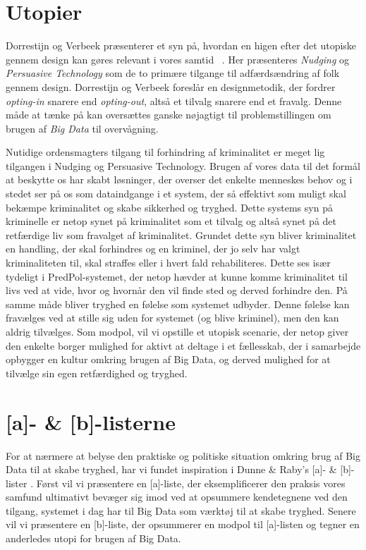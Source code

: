 \section*{Utopier}
Dorrestijn og Verbeek præsenterer et syn på, hvordan en higen efter det utopiske gennem design kan gøres relevant i vores samtid~\cite[]{dorrestijn2013technology} . Her præsenteres \textit{Nudging} og \textit{Persuasive Technology} som de to primære tilgange til adfærdsændring af folk gennem design. Dorrestijn og Verbeek foreslår en designmetodik, der fordrer \textit{opting-in} snarere end \textit{opting-out}, altså et tilvalg snarere end et fravalg. Denne måde at tænke på kan oversættes ganske nøjagtigt til problemstillingen om brugen af \textit{Big Data} til overvågning.

Nutidige ordensmagters tilgang til forhindring af kriminalitet er meget lig tilgangen i Nudging og Persuasive Technology. Brugen af vores data til det formål at beskytte os har skabt løsninger, der overser det enkelte menneskes behov og i stedet ser på os som dataindgange i et system, der så effektivt som muligt skal bekæmpe kriminalitet og skabe sikkerhed og tryghed. Dette systems syn på kriminelle er netop synet på kriminalitet som et tilvalg og altså synet på det retfærdige liv som fravalget af kriminalitet. Grundet dette syn bliver kriminalitet en handling, der skal forhindres og en kriminel, der jo selv har valgt kriminaliteten til, skal straffes eller i hvert fald rehabiliteres. Dette ses især tydeligt i PredPol-systemet, der netop hævder at kunne komme kriminalitet til livs ved at vide, hvor og hvornår den vil finde sted og derved forhindre den. På samme måde bliver tryghed en følelse som systemet udbyder. Denne følelse kan fravælges ved at stille sig uden for systemet (og blive kriminel), men den kan aldrig tilvælges. Som modpol, vil vi opstille et utopisk scenarie, der netop giver den enkelte borger mulighed for aktivt at deltage i et fællesskab, der i samarbejde opbygger en kultur omkring brugen af Big Data, og derved mulighed for at tilvælge sin egen retfærdighed og tryghed.

\section*{[a]- \& [b]-listerne}
For at nærmere at belyse den praktiske og politiske situation omkring brug af Big Data til at skabe tryghed, har vi fundet inspiration i Dunne \& Raby's [a]- \& [b]-lister \cite[]{ABList}. Først vil vi præsentere en [a]-liste, der eksemplificerer den praksis vores samfund ultimativt bevæger sig imod ved at  opsummere kendetegnene ved den tilgang, systemet i dag har til Big Data som værktøj til at skabe tryghed. Senere vil vi præsentere en [b]-liste, der opsummerer en modpol til [a]-listen og tegner en anderledes utopi for brugen af Big Data.

